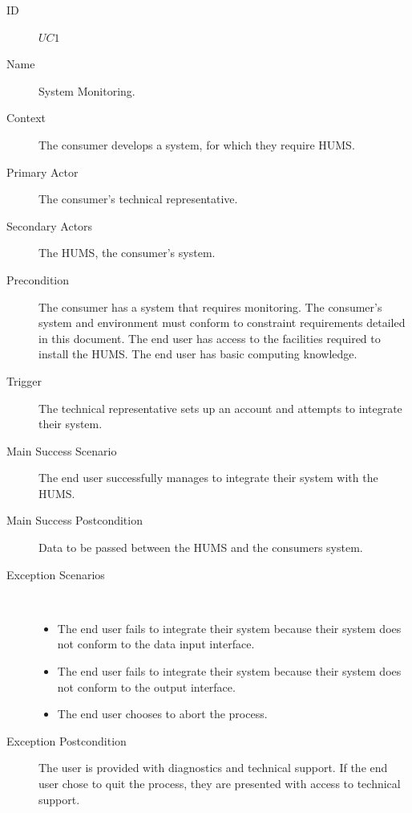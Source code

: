 \documentclass[10pt,a4paper]{article}
\begin{document}
\begin{description}
	\item[ID] $UC1$
	\item[Name]  System Monitoring.
	\item[Context] The consumer develops a system, for which they
	               require HUMS.
	\item[Primary Actor] The consumer's technical representative.
	\item[Secondary Actors] The HUMS, the consumer's system.
	\item[Precondition] The consumer has a system that requires monitoring.
	                    The consumer's system and environment must conform to constraint
	                     requirements detailed in this document. The
	                    end user has access to the facilities required to install
	                    the HUMS. The end user has basic computing knowledge.
	\item[Trigger] The technical representative sets up an account and attempts to integrate
	               their system.
	\item[Main Success Scenario] The end user successfully manages to integrate
			their system with the HUMS.
	\item[Main Success Postcondition] Data to be passed between the HUMS and the 
					consumers system.
	\item[Exception Scenarios] ~
			\begin{itemize}
				\item The end user fails to integrate their system because
				      their system does not conform to the data input interface.
				\item The end user fails to integrate their system because
				      their system does not conform to the output interface.
				\item The end user chooses to abort the process.
			\end{itemize}
	\item[Exception Postcondition]
			The user is provided with diagnostics and technical support. 
			If the end user chose to quit the process, they are
			presented with access to technical support.
\end{description}

\vspace{\baselineskip}
\end{document}
